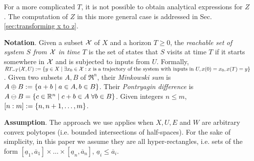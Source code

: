 For a more complicated $T$, it is not possible to obtain analytical expressions for $Z$. 
The computation of $Z$ in this more general case is addressed in Sec. \ref{sec:transforming x to z}.

\textbf{Notation}.
Given a subset $\mathcal{X}$ of $X$ and a horizon $T \geq 0$, the \emph{reachable set of system $S$ from $\mathcal{X}$ in time $T$} is the set of states that $S$ visits at time $T$ if it starts somewhere in $\mathcal{X}$ and is subjected to inputs from $U$.
Formally, $RT_{=T}(\mathcal{X},U) := \{y \in X \;|\; \exists x_0 \in \mathcal{X}: x \text{ is a trajectory of the system with inputs in }U, x(0)=x_0, x(T)=y\}$.
Given two subsets $A,B$ of $\Re^n$, their \textit{Minkowski sum} is $A\oplus B := \{a+b \;|\; a\in A, b\in B\}$.
Their \emph{Pontryagin difference} is $A\ominus B = \{c \in \mathbb{R}^n \;|\; c+b \in A\; \forall b \in B\}$.
Given integers $n \leq m$, $[n:m] := \{n,n+1,\ldots,m\}$.

\textbf{Assumption}. 
The approach we use applies when $X, U, E$ and $W$ are arbitrary convex polytopes (i.e. bounded intersections of half-spaces).
For the sake of simplicity, in this paper we assume they are all hyper-rectangles, i.e. sets of the form $[\underline{a}_1, \overline{a}_1] \times \ldots \times  [\underline{a}_n, \overline{a}_n]$, $\underline{a}_i \leq \overline{a}_i$.